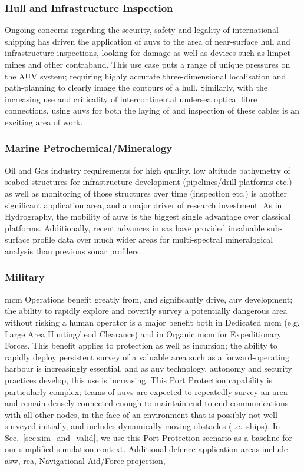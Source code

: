 \subsubsection{Hull and Infrastructure Inspection}
Ongoing concerns regarding the security, safety and legality of international shipping has driven the application of \glspl{auv} to the area of near-surface hull and infrastructure inspections, looking for damage as well as devices such as limpet mines and other contraband.
This use case puts a range of unique pressures on the AUV system; requiring highly accurate three-dimensional localisation and path-planning to clearly image the contours of a hull\cite{Nicholson2008}.
Similarly, with the increasing use and criticality of intercontinental undersea optical fibre connections, using \glspl{auv} for both the laying of and inspection of these cables is an exciting area of work\cite{Yu2004}\cite{Asakawa2002}.

\subsubsection{Marine Petrochemical/Mineralogy}
Oil and Gas industry requirements for high quality, low altitude bathymetry of seabed structures for infrastructure development (pipelines/drill platforms etc.) as well as monitoring of those structures over time (inspection etc.) is another significant application area, and a major driver of research investment.
As in Hydrography, the mobility of \glspl{auv} is the biggest single advantage over classical platforms\cite{Morr2003}.
Additionally, recent advances in \gls{sas} have provided invaluable sub-surface profile data over much wider areas for multi-spectral mineralogical analysis than previous sonar profilers\cite{Denny2015}.

\subsubsection{Military}
\gls{mcm} Operations benefit greatly from, and significantly drive, \gls{auv} development; the ability to rapidly explore and covertly survey a potentially dangerous area without risking a human operator is a major benefit both in Dedicated \gls{mcm} (e.g. Large Area Hunting/ \gls{eod} Clearance) and in Organic \gls{mcm} for Expeditionary Forces.
This benefit applies to protection as well as incursion; the ability to rapidly deploy persistent survey of a valuable area such as a forward-operating harbour is increasingly essential, and as \gls{auv} technology, autonomy and security practices develop, this use is increasing.
This Port Protection capability is particularly complex;  teams of \glspl{auv} are expected to repeatedly survey an area and remain densely-connected enough to maintain end-to-end communications with all other nodes, in the face of an environment that is possibly not well surveyed initially, and includes dynamically moving obstacles (i.e.\ ships).
In Sec.~\ref{sec:sim_and_valid}, we use this Port Protection scenario as a baseline for our simplified simulation context.
Additional defence application areas include \gls{asw}, \gls{rea}, Navigational Aid/Force projection, 



